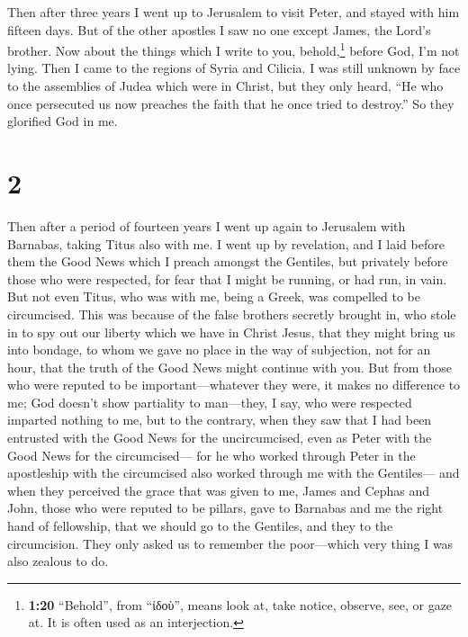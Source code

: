  Then after three years I went up to Jerusalem to visit
Peter, and stayed with him fifteen days.  But of the
other apostles I saw no one except James, the Lord's brother.
 Now about the things which I write to you,
behold,\footnote{\textbf{1:20} ``Behold'', from ``ἰδοὺ'', means look at,
  take notice, observe, see, or gaze at. It is often used as an
  interjection.} before God, I'm not lying.  Then I came
to the regions of Syria and Cilicia.  I was still unknown
by face to the assemblies of Judea which were in Christ, 
but they only heard, ``He who once persecuted us now preaches the faith
that he once tried to destroy.''  So they glorified God
in me.

\hypertarget{section-1}{%
\section{2}\label{section-1}}

 Then after a period of fourteen years I went up again to
Jerusalem with Barnabas, taking Titus also with me.  I
went up by revelation, and I laid before them the Good News which I
preach amongst the Gentiles, but privately before those who were
respected, for fear that I might be running, or had run, in vain.
 But not even Titus, who was with me, being a Greek, was
compelled to be circumcised.  This was because of the
false brothers secretly brought in, who stole in to spy out our liberty
which we have in Christ Jesus, that they might bring us into bondage,
 to whom we gave no place in the way of subjection, not
for an hour, that the truth of the Good News might continue with you.
 But from those who were reputed to be
important---whatever they were, it makes no difference to me; God
doesn't show partiality to man---they, I say, who were respected
imparted nothing to me,  but to the contrary, when they
saw that I had been entrusted with the Good News for the uncircumcised,
even as Peter with the Good News for the circumcised--- 
for he who worked through Peter in the apostleship with the circumcised
also worked through me with the Gentiles---  and when they
perceived the grace that was given to me, James and Cephas and John,
those who were reputed to be pillars, gave to Barnabas and me the right
hand of fellowship, that we should go to the Gentiles, and they to the
circumcision.  They only asked us to remember the
poor---which very thing I was also zealous to do.

